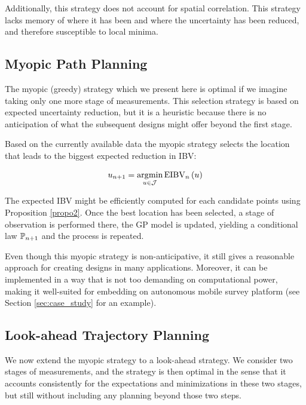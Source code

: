 Additionally, this strategy does not account for spatial
correlation. This strategy lacks memory of where it has been and where
the uncertainty has been reduced, and therefore susceptible to local
minima.

\subsection{Myopic Path Planning}
\label{sec:myopic}

The myopic (greedy) strategy which we present here is optimal if we
imagine taking only one more stage of measurements. This selection
strategy is based on expected uncertainty reduction, but it is a
heuristic because there is no anticipation of what the subsequent
designs might offer beyond the first stage.

Based on the currently available data the myopic strategy selects the location that leads to the biggest expected reduction in IBV:
\begin{criterion}[Myopic]
\begin{equation}\label{critSEQ}
    \spatloc_{\stage + 1} = \argmin_{\spatloc \in \candidates} \EIBV_{\stage}\left(\spatloc\right)
\end{equation}
\end{criterion}

The expected IBV might be efficiently computed for each candidate points using Proposition \ref{propo2}. Once the best location has been selected, a stage of observation is performed there, the GP model is updated, yielding a conditional law $\mathbb{P}_{n + 1}$ and the process is repeated.

Even though this myopic strategy is non-anticipative, it still gives a
reasonable approach for creating designs in many
applications. Moreover, it can be implemented in a way that is not too demanding on computational power, making it well-suited for embedding on autonomous mobile survey platform (see Section \ref{sec:case_study} for an example).


\subsection{Look-ahead Trajectory Planning}\label{sec:LA}

We now extend the myopic strategy to a look-ahead strategy. We consider two stages of
measurements, and the strategy is then optimal in the sense that it accounts consistently for the expectations and minimizations in these two stages, but still without including any planning beyond those two steps.

